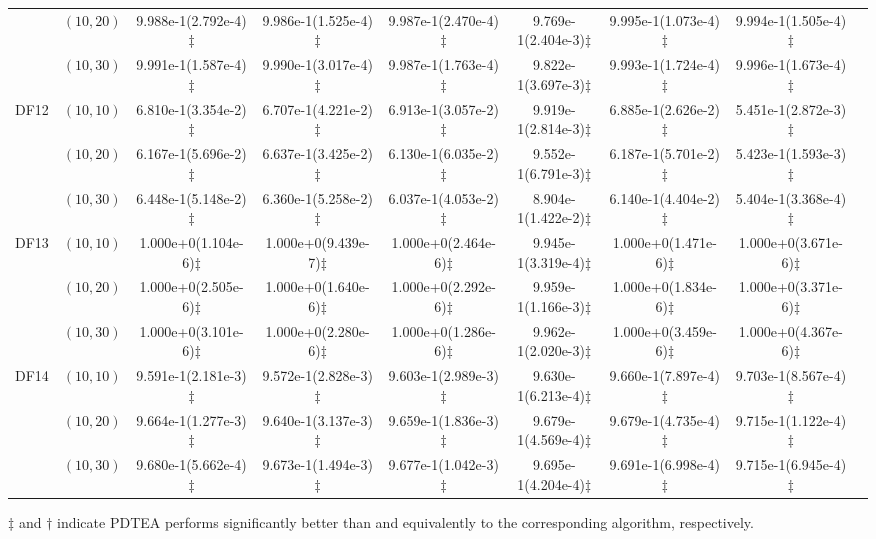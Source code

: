 \documentclass[review]{elsarticle}
\begin{document}
\begin{table*}[!tbh]
{{\begin{tabular} {ccccccccc}
&$(10,20)$ &9.988e-1(2.792e-4)$\ddagger$ &9.986e-1(1.525e-4)$\ddagger$ &9.987e-1(2.470e-4)$\ddagger$ &9.769e-1(2.404e-3)$\ddagger$ &9.995e-1(1.073e-4)$\ddagger$ &9.994e-1(1.505e-4)$\ddagger$ \\
&$(10,30)$ &9.991e-1(1.587e-4)$\ddagger$ &9.990e-1(3.017e-4)$\ddagger$ &9.987e-1(1.763e-4)$\ddagger$ &9.822e-1(3.697e-3)$\ddagger$ &9.993e-1(1.724e-4)$\ddagger$ &9.996e-1(1.673e-4)$\ddagger$ \\
\hline  \multirow{3}{*}{DF12}
&$(10,10)$ &6.810e-1(3.354e-2)$\ddagger$ &6.707e-1(4.221e-2)$\ddagger$ &6.913e-1(3.057e-2)$\ddagger$ &9.919e-1(2.814e-3)$\ddagger$ &6.885e-1(2.626e-2)$\ddagger$ &5.451e-1(2.872e-3)$\ddagger$ \\
&$(10,20)$ &6.167e-1(5.696e-2)$\ddagger$ &6.637e-1(3.425e-2)$\ddagger$ &6.130e-1(6.035e-2)$\ddagger$ &9.552e-1(6.791e-3)$\ddagger$ &6.187e-1(5.701e-2)$\ddagger$ &5.423e-1(1.593e-3)$\ddagger$ \\
&$(10,30)$ &6.448e-1(5.148e-2)$\ddagger$ &6.360e-1(5.258e-2)$\ddagger$ &6.037e-1(4.053e-2)$\ddagger$ &8.904e-1(1.422e-2)$\ddagger$ &6.140e-1(4.404e-2)$\ddagger$ &5.404e-1(3.368e-4)$\ddagger$ \\
\hline  \multirow{3}{*}{DF13}
&$(10,10)$ &1.000e+0(1.104e-6)$\ddagger$ &1.000e+0(9.439e-7)$\ddagger$ &1.000e+0(2.464e-6)$\ddagger$ &9.945e-1(3.319e-4)$\ddagger$ &1.000e+0(1.471e-6)$\ddagger$ &1.000e+0(3.671e-6)$\ddagger$ \\
&$(10,20)$ &1.000e+0(2.505e-6)$\ddagger$ &1.000e+0(1.640e-6)$\ddagger$ &1.000e+0(2.292e-6)$\ddagger$ &9.959e-1(1.166e-3)$\ddagger$ &1.000e+0(1.834e-6)$\ddagger$ &1.000e+0(3.371e-6)$\ddagger$ \\
&$(10,30)$ &1.000e+0(3.101e-6)$\ddagger$ &1.000e+0(2.280e-6)$\ddagger$ &1.000e+0(1.286e-6)$\ddagger$ &9.962e-1(2.020e-3)$\ddagger$ &1.000e+0(3.459e-6)$\ddagger$ &1.000e+0(4.367e-6)$\ddagger$ \\
\hline  \multirow{3}{*}{DF14}
&$(10,10)$ &9.591e-1(2.181e-3)$\ddagger$ &9.572e-1(2.828e-3)$\ddagger$ &9.603e-1(2.989e-3)$\ddagger$ &9.630e-1(6.213e-4)$\ddagger$ &9.660e-1(7.897e-4)$\ddagger$ &9.703e-1(8.567e-4)$\ddagger$ \\
&$(10,20)$ &9.664e-1(1.277e-3)$\ddagger$ &9.640e-1(3.137e-3)$\ddagger$ &9.659e-1(1.836e-3)$\ddagger$ &9.679e-1(4.569e-4)$\ddagger$ &9.679e-1(4.735e-4)$\ddagger$ &9.715e-1(1.122e-4)$\ddagger$ \\
&$(10,30)$ &9.680e-1(5.662e-4)$\ddagger$ &9.673e-1(1.494e-3)$\ddagger$ &9.677e-1(1.042e-3)$\ddagger$ &9.695e-1(4.204e-4)$\ddagger$ &9.691e-1(6.998e-4)$\ddagger$ &9.715e-1(6.945e-4)$\ddagger$ \\
\midrule
\bottomrule[1pt]
\end{tabular}}
}
\begin{tablenotes}
\item $\ddagger$ and $ \dagger$ indicate PDTEA performs significantly better than and equivalently to the corresponding algorithm, respectively.
\end{tablenotes}
\scriptsize
\end{table*}
\end{document}

